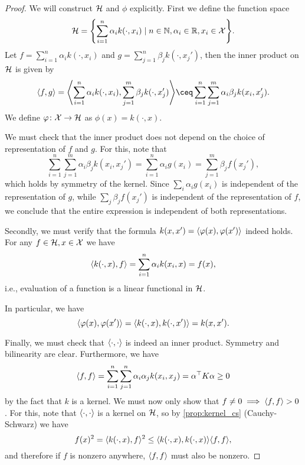 \begin{proof}
    We will construct $\mathcal H$ and $\phi$ explicitly. First we define the function space
    \[
    \mathcal H = \qty{ \sum_{i=1}^n \alpha_i k(\cdot, x_i) \mid n \in \mathbb N,  \alpha_i \in \mathbb R, x_i \in \mathcal X}. 
    \]
    Let $f = \sum_{i=1}^n \alpha_i k(\cdot, x_i)$ and $g = \sum_{j=1}^n \beta_j k(\cdot, x_j')$, then the inner product on $\mathcal H$ is given by
    \[
    \ang{f, g} = \ang*{\sum_{i=1}^n \alpha_i k(\cdot, x_i), \sum_{j=1}^m \beta_j k(\cdot, x_j')} \ceq \sum_{i=1}^n \sum_{j=1}^m \alpha_i \beta_j k(x_i, x_j'). 
    \]
    We define $\varphi \colon \mathcal X \to \mathcal H$ as $\phi(x) = k(\cdot, x)$. 
    
    We must check that the inner product does not depend on the choice of representation of $f$ and $g$. For this, note that 
    \[
    \sum_{i=1}^n \sum_{j=1}^m \alpha_i\beta_j k(x_i, x_j') = \sum_{i=1}^n \alpha_i g(x_i) = \sum_{j=1}^m \beta_j f(x_j'),
    \]
    which holds by symmetry of the kernel. Since $\sum_i \alpha_i g(x_i)$ is independent of the representation of $g$, while $\sum_j \beta_j f(x_j')$ is independent of the representation of $f$, we conclude that the entire expression is independent of both representations. 
    
    Secondly, we must verify that the formula $k(x, x') = \langle\varphi(x), \varphi(x')\rangle$ indeed holds. For any $f \in \mathcal H, x \in \mathcal X$ we have
    \begin{equation}
    \langle k(\cdot, x), f\rangle = \sum_{i=1}^n \alpha_i k(x_i, x) = f(x),
    \end{equation}
    i.e., evaluation of a function is a linear functional in $\mathcal H$. 
    
    In particular, we have 
    \[
    \langle\varphi(x), \varphi(x')\rangle = \langle k(\cdot, x), k(\cdot, x')\rangle =  k(x, x'). 
    \]
    
    Finally, we must check that $\langle\cdot, \cdot\rangle$ is indeed an inner product. Symmetry and bilinearity are clear. Furthermore, we have
    \[
   \langle f, f\rangle = \sum_{i=1}^n \sum_{j=1}^n \alpha_i \alpha_j k(x_i, x_j) = \alpha^\top K\alpha \geq 0
    \]
    by the fact that $k$ is a kernel. We must now only show that $f \neq 0 \implies \langle f, f\rangle > 0$. For this, note that $\langle\cdot, \cdot\rangle$ is a kernel on $\mathcal H$, so by \cref{prop:kernel_cs} (Cauchy-Schwarz) we have
    \[
    f(x)^2 = \langle k(\cdot, x), f\rangle^2 \leq \langle k(\cdot, x), k(\cdot, x)\rangle \langle f, f\rangle, 
    \]
    and therefore if $f$ is nonzero anywhere, $\langle f, f\rangle$ must also be nonzero. 
\end{proof}

